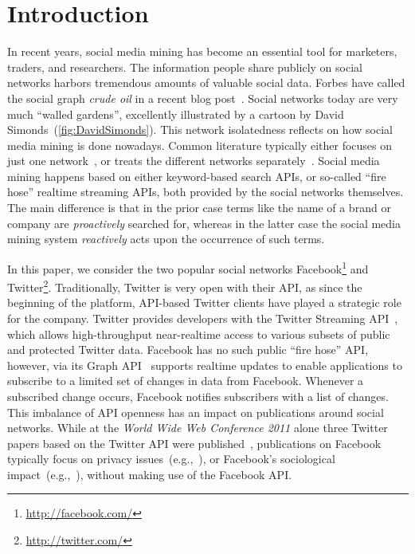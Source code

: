 \documentclass{iosart2c}
\begin{document}

\section{Introduction} \label{sec:introduction}
In recent years, social media mining has become an essential tool for marketers, traders, and researchers.
The information people share publicly on social networks harbors tremendous amounts of valuable social data.
Forbes have called the social graph \emph{crude oil} in a recent blog post~\cite{ForbesPost}.
Social networks today are very much ``walled gardens'', excellently illustrated by a cartoon by David Simonds~(\autoref{fig:DavidSimonds}).
This network isolatedness reflects on how social media mining is done nowadays.
Common literature typically either focuses on just one network~\cite{russell201121}, or treats the different networks separately~\cite{russell2011mining}.
Social media mining happens based on either keyword-based search APIs, or so-called ``fire hose'' realtime streaming APIs, both provided by the social networks themselves.
The main difference is that in the prior case terms like the name of a brand or company are \emph{proactively} searched for, whereas in the latter case the social media mining system \emph{reactively} acts upon the occurrence of such terms.

In this paper, we consider the two popular social networks Facebook\footnote{\url{http://facebook.com/}} and Twitter\footnote{\url{http://twitter.com/}}.
Traditionally, Twitter is very open with their API, as since the beginning of the platform, API-based Twitter clients have played a strategic role for the company.
Twitter provides developers with the Twitter Streaming API~\cite{TwitterStreamingAPI}, which allows high-throughput near-realtime access to various subsets of public and protected Twitter data.
Facebook has no such public ``fire hose'' API, however, via its Graph API~\cite{FacebookRealtimeAPI} supports realtime updates to enable applications to subscribe to a limited set of changes in data from Facebook.
Whenever a subscribed change occurs, Facebook notifies subscribers with a list of changes.
This imbalance of API openness has an impact on publications around social networks.
While at the \textit{World Wide Web Conference 2011} alone three Twitter papers based on the Twitter API were published~\cite{Romero:2011:DMI:1963405.1963503, Meeder:2011:WKY:1963405.1963479, Wu:2011:SWT:1963405.1963504}, publications on Facebook typically focus on privacy issues~(e.g.,~\cite{liu:settings}), or Facebook's sociological impact~(e.g.,~\cite{JCC4:JCC4367}), without making use of the Facebook API.
\end{document}
